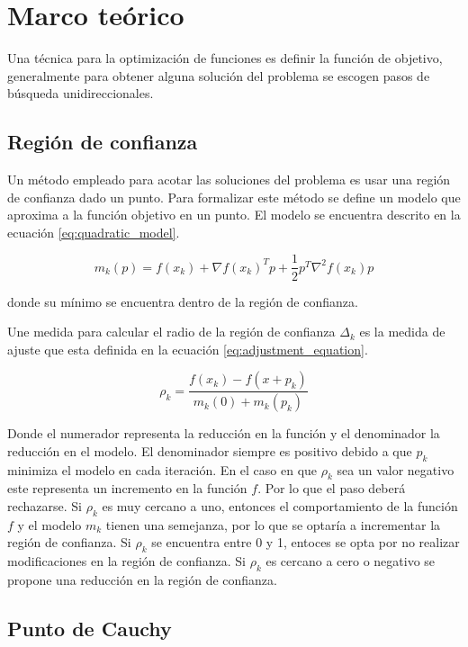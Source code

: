 \section{Marco teórico}

Una técnica para la optimización de funciones es definir la función de objetivo, generalmente para obtener alguna solución del problema se escogen pasos de búsqueda unidireccionales.

\subsection{Región de confianza \label{sec:trust_region}}

Un método empleado para acotar las soluciones del problema es usar una región de confianza dado un punto. Para formalizar este método se define un modelo que aproxima a la función objetivo en un punto. El modelo se encuentra descrito en la ecuación \ref{eq:quadratic_model}.

\begin{equation}
    m_k (p) = f(x_k) + \nabla f(x_k)^T p + \frac{1}{2} p^T \nabla^2 f(x_k) p
    \label{eq:quadratic_model}
\end{equation}

donde su mínimo se encuentra dentro de la región de confianza.

Une medida para calcular el radio de la región de confianza  $\Delta_k$ es la medida de ajuste que esta definida en la ecuación \ref{eq:adjustment_equation}.

\begin{equation*}
    \rho_k = \frac{f(x_k)-f(x+p_k)}{m_k(0)+m_k(p_k)}  \label{eq:adjustment_equation}
\end{equation*}

Donde el numerador representa la reducción en la función y el denominador la reducción en el modelo. El denominador siempre es positivo debido a que $p_k$ minimiza el modelo en cada iteración. En el caso en que $\rho_k$ sea un valor negativo este representa un incremento en la función $f$. Por lo que el paso deberá rechazarse. Si $\rho_k$ es muy cercano a uno, entonces el comportamiento de la función $f$ y el modelo $m_k$ tienen una semejanza, por lo que se optaría a incrementar la región de confianza. Si $\rho_k$ se encuentra entre 0 y 1, entoces se opta por no realizar modificaciones en la región de confianza. Si $\rho_k$ es cercano a cero o negativo se propone una reducción en la región de confianza.

\subsection{Punto de Cauchy}

